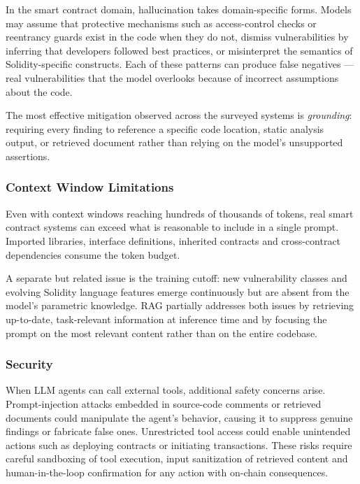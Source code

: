 In the smart contract domain, hallucination takes domain-specific forms. Models may assume that protective mechanisms such as access-control checks or reentrancy guards exist in the code when they do not, dismiss vulnerabilities by inferring that developers followed best practices, or misinterpret the semantics of Solidity-specific constructs. Each of these patterns can produce false negatives --- real vulnerabilities that the model overlooks because of incorrect assumptions about the code.

The most effective mitigation observed across the surveyed systems is \emph{grounding}: requiring every finding to reference a specific code location, static analysis output, or retrieved document rather than relying on the model's unsupported assertions.

\subsubsection*{Context Window Limitations}
Even with context windows reaching hundreds of thousands of tokens, real smart contract systems can exceed what is reasonable to include in a single prompt. Imported libraries, interface definitions, inherited contracts and cross-contract dependencies consume the token budget.

A separate but related issue is the training cutoff: new vulnerability classes and evolving Solidity language features emerge continuously but are absent from the model's parametric knowledge. RAG partially addresses both issues by retrieving up-to-date, task-relevant information at inference time and by focusing the prompt on the most relevant content rather than on the entire codebase.

\subsubsection*{Security}
When LLM agents can call external tools, additional safety concerns arise. Prompt-injection attacks embedded in source-code comments or retrieved documents could manipulate the agent's behavior, causing it to suppress genuine findings or fabricate false ones. Unrestricted tool access could enable unintended actions such as deploying contracts or initiating transactions. These risks require careful sandboxing of tool execution, input sanitization of retrieved content and human-in-the-loop confirmation for any action with on-chain consequences.

